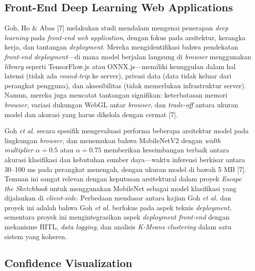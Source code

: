 \subsection{Front-End Deep Learning Web Applications}
\label{subsec:penelitian-frontend-dl}

Goh, Ho \& Abas [7] melakukan studi mendalam mengenai penerapan \textit{deep learning} pada \textit{front-end web application}, dengan fokus pada arsitektur, kerangka kerja, dan tantangan \textit{deployment}. Mereka mengidentifikasi bahwa pendekatan \textit{front-end deployment}—di mana model berjalan langsung di \textit{browser} menggunakan \textit{library} seperti TensorFlow.js atau ONNX.js—memiliki keunggulan dalam hal latensi (tidak ada \textit{round-trip} ke server), privasi data (data tidak keluar dari perangkat pengguna), dan aksesibilitas (tidak memerlukan infrastruktur server). Namun, mereka juga mencatat tantangan signifikan: keterbatasan memori \textit{browser}, variasi dukungan WebGL antar \textit{browser}, dan \textit{trade-off} antara ukuran model dan akurasi yang harus dikelola dengan cermat [7].

Goh \textit{et al.} secara spesifik mengevaluasi performa beberapa arsitektur model pada lingkungan \textit{browser}, dan menemukan bahwa MobileNetV2 dengan \textit{width multiplier} $\alpha = 0.5$ atau $\alpha = 0.75$ memberikan keseimbangan terbaik antara akurasi klasifikasi dan kebutuhan sumber daya—waktu inferensi berkisar antara 30--100 ms pada perangkat menengah, dengan ukuran model di bawah 5 MB [7]. Temuan ini sangat relevan dengan keputusan arsitektural dalam proyek \textit{Escape the Sketchbook} untuk menggunakan MobileNet sebagai model klasifikasi yang dijalankan di \textit{client-side}. Perbedaan mendasar antara kajian Goh \textit{et al.} dan proyek ini adalah bahwa Goh \textit{et al.} berfokus pada aspek teknis \textit{deployment}, sementara proyek ini mengintegrasikan aspek \textit{deployment front-end} dengan mekanisme HITL, \textit{data logging}, dan analisis \textit{K-Means clustering} dalam satu sistem yang koheren.

\subsection{Confidence Visualization}
\label{subsec:penelitian-confidence-vis}

